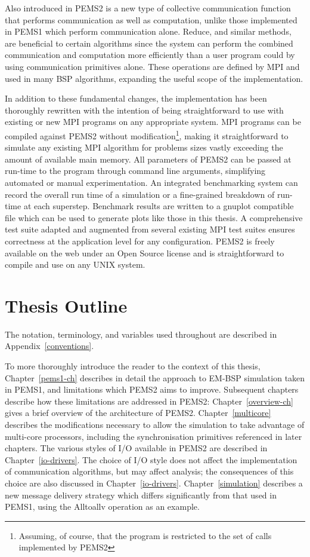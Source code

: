 \documentclass[12pt]{carletoncsthesis}
\begin{document}
Also introduced in PEMS2 is a new type of collective communication function
that performs communication as well as computation, unlike those implemented
in PEMS1 which perform communication alone.  {\sc Reduce}, and similar methods,
are beneficial to certain algorithms since the system can perform the combined
communication and computation more efficiently than a user program could by
using communication primitives alone.  These operations are defined by MPI and
used in many BSP algorithms, expanding the useful scope of the implementation.

In addition to these fundamental changes, the implementation has been
thoroughly rewritten with the intention of being straightforward to use with
existing or new MPI programs on any appropriate system.  MPI programs can be
compiled against PEMS2 without modification\footnote{Assuming, of course,
that the program is restricted to the set of calls implemented by PEMS2},
making it straightforward to simulate any existing MPI algorithm for problems
sizes vastly exceeding the amount of available main memory.  All parameters of
PEMS2 can be passed at run-time to the program through command line arguments,
simplifying automated or manual experimentation.  An integrated benchmarking
system can record the overall run time of a simulation or a fine-grained
breakdown of run-time at each superstep.  Benchmark results are written to
a gnuplot compatible file which can be used to generate plots like those in
this thesis.  A comprehensive test suite adapted and augmented from several
existing MPI test suites ensures correctness at the application level for
any configuration.  PEMS2 is freely available on the web \cite{pems2site}
under an Open Source license and is straightforward to compile and use on
any UNIX system.

\section{Thesis Outline}


The notation, terminology, and variables used throughout are described in
Appendix~\ref{conventions}.

To more thoroughly introduce the reader to the context of this thesis,
Chapter~\ref{pems1-ch} describes in detail the approach to EM-BSP
simulation taken in PEMS1, and limitations which PEMS2 aims to improve.
Subsequent chapters describe how these limitations are addressed in PEMS2:
Chapter~\ref{overview-ch} gives a brief overview of the architecture of
PEMS2.  Chapter~\ref{multicore} describes the modifications necessary to
allow the simulation to take advantage of multi-core processors, including
the synchronisation primitives referenced in later chapters.  The various
styles of I/O available in PEMS2 are described in Chapter~\ref{io-drivers}.
The choice of I/O style does not affect the implementation of communication
algorithms, but may affect analysis; the consequences of this choice are also
discussed in Chapter~\ref{io-drivers}.  Chapter~\ref{simulation} describes
a new message delivery strategy which differs significantly from that used
in PEMS1, using the {\sc Alltoallv} operation as an example.
\end{document}
